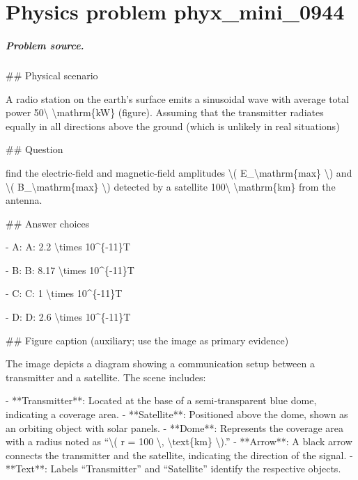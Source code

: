 
\chapter{Physics problem phyx\_mini\_0944}
\label{ch:PhyXMiniProblems_problem_phyx_mini_0944}

\paragraph{Problem source.}
\#\# Physical scenario

A radio station on the earth’s surface emits a sinusoidal wave with average total power 50\textbackslash{} \textbackslash{}mathrm\{kW\} (figure). Assuming that the transmitter radiates equally in all directions above the ground (which is unlikely in real situations)

\#\# Question

find the electric-field and magnetic-field amplitudes \textbackslash{}( E\_\textbackslash{}mathrm\{max\} \textbackslash{}) and \textbackslash{}( B\_\textbackslash{}mathrm\{max\} \textbackslash{}) detected by a satellite 100\textbackslash{} \textbackslash{}mathrm\{km\} from the antenna.

\#\# Answer choices

- A: A: 2.2 \textbackslash{}times 10\textasciicircum{}\{-11\}T

- B: B: 8.17 \textbackslash{}times 10\textasciicircum{}\{-11\}T

- C: C: 1 \textbackslash{}times 10\textasciicircum{}\{-11\}T

- D: D: 2.6 \textbackslash{}times 10\textasciicircum{}\{-11\}T

\#\# Figure caption (auxiliary; use the image as primary evidence)

The image depicts a diagram showing a communication setup between a transmitter and a satellite. The scene includes:

- **Transmitter**: Located at the base of a semi-transparent blue dome, indicating a coverage area.
- **Satellite**: Positioned above the dome, shown as an orbiting object with solar panels.
- **Dome**: Represents the coverage area with a radius noted as “\textbackslash{}( r = 100 \textbackslash{}, \textbackslash{}text\{km\} \textbackslash{}).”
- **Arrow**: A black arrow connects the transmitter and the satellite, indicating the direction of the signal.
- **Text**: Labels “Transmitter” and “Satellite” identify the respective objects.

